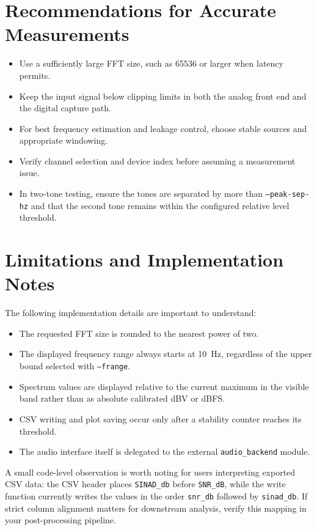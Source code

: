 \documentclass[conference]{IEEEtran}
\begin{document}
\section{Recommendations for Accurate Measurements}
\begin{itemize}[leftmargin=*,nosep]
    \item Use a sufficiently large FFT size, such as 65536 or larger when latency permits.
    \item Keep the input signal below clipping limits in both the analog front end and the digital capture path.
    \item For best frequency estimation and leakage control, choose stable sources and appropriate windowing.
    \item Verify channel selection and device index before assuming a measurement issue.
    \item In two-tone testing, ensure the tones are separated by more than \texttt{--peak-sep-hz} and that the second tone remains within the configured relative level threshold.
\end{itemize}

\section{Limitations and Implementation Notes}
The following implementation details are important to understand:
\begin{itemize}[leftmargin=*,nosep]
    \item The requested FFT size is rounded to the nearest power of two.
    \item The displayed frequency range always starts at \SI{10}{Hz}, regardless of the upper bound selected with \texttt{--frange}.
    \item Spectrum values are displayed relative to the current maximum in the visible band rather than as absolute calibrated dBV or dBFS.
    \item CSV writing and plot saving occur only after a stability counter reaches its threshold.
    \item The audio interface itself is delegated to the external \texttt{audio\_backend} module.
\end{itemize}

A small code-level observation is worth noting for users interpreting exported CSV data: the CSV header places \texttt{SINAD\_db} before \texttt{SNR\_dB}, while the write function currently writes the values in the order \texttt{snr\_db} followed by \texttt{sinad\_db}. If strict column alignment matters for downstream analysis, verify this mapping in your post-processing pipeline.
\end{document}
